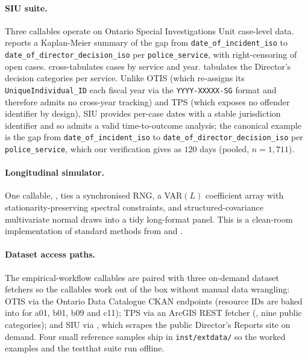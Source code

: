 \documentclass[article,shortnames,nojss]{jss}
\begin{document}
\paragraph{SIU suite.}  Three callables operate on Ontario Special
Investigations Unit case-level data.
 reports a Kaplan-Meier summary
of the gap from \texttt{date\_of\_incident\_iso} to
\texttt{date\_of\_director\_decision\_iso} per
\texttt{police\_service}, with right-censoring of open cases.
 cross-tabulates cases by service
and year.   tabulates the
Director's decision categories per service.  Unlike OTIS (which
re-assigns its \texttt{UniqueIndividual\_ID} each fiscal year via
the \texttt{YYYY-XXXXX-SG} format and therefore admits no
cross-year tracking) and TPS (which exposes no offender
identifier by design), SIU provides per-case dates with a stable
jurisdiction identifier and so admits a valid time-to-outcome
analysis; the canonical example is the gap from
\texttt{date\_of\_incident\_iso} to
\texttt{date\_of\_director\_decision\_iso} per
\texttt{police\_service}, which our verification gives
as $120$ days (pooled, $n = 1{,}711$).

\paragraph{Longitudinal simulator.}  One callable,
, ties a synchronised
RNG, a VAR$(L)$ coefficient array with stationarity-preserving
spectral constraints, and structured-covariance multivariate
normal draws into a tidy long-format panel.  This is a clean-room
implementation of standard methods from
\citet{hamilton1994timeseries} and
\citet{diggle1994longitudinal}.

\paragraph{Dataset access paths.}  The empirical-workflow
callables are paired with three on-demand dataset fetchers so the
callables work out of the box without manual data wrangling: OTIS
via the Ontario Data Catalogue CKAN endpoints (resource IDs are
baked into  for a01, b01, b09 and
c11); TPS via an ArcGIS REST fetcher
(, nine public categories); and SIU via
, which scrapes the public Director's
Reports site on demand.  Four small reference samples ship in
\texttt{inst/extdata/} so the worked examples and the testthat
suite run offline.
\end{document}
